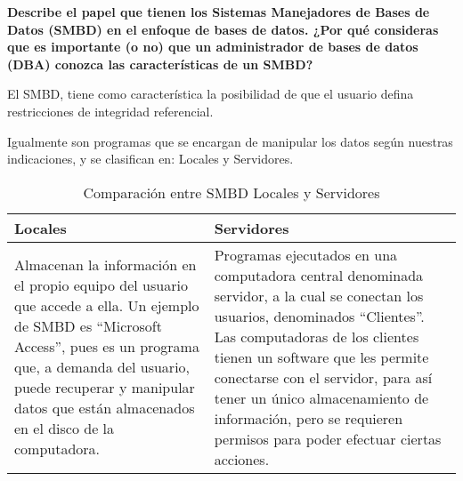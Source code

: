 \begin{center} 
\textbf{Describe el papel que tienen los Sistemas Manejadores de Bases de Datos (SMBD) en el enfoque
de bases de datos. ¿Por qué consideras que es importante (o no) que un administrador de bases
de datos (DBA) conozca las características de un SMBD?}
\\
\end{center}



El SMBD, tiene como característica la posibilidad de que el usuario defina restricciones de integridad referencial.

Igualmente son programas que se encargan de manipular los datos según nuestras indicaciones, y se clasifican en: Locales y Servidores. \\

\begin{table}[h!]
\centering
\begin{tabularx}{\textwidth}{|X|X|}
\hline
\textbf{Locales} & \textbf{Servidores} \\
\hline
Almacenan la información en el propio equipo del usuario que accede a ella. Un ejemplo de SMBD es “Microsoft Access”, pues es un programa que, a demanda del usuario, puede recuperar y manipular datos que están almacenados en el disco de la computadora. & Programas ejecutados en una computadora central denominada servidor, a la cual se conectan los usuarios, denominados “Clientes”. Las computadoras de los clientes tienen un software que les permite conectarse con el servidor, para así tener un único almacenamiento de información, pero se requieren permisos para poder efectuar ciertas acciones. \\
\hline
\end{tabularx}
\caption{Comparación entre SMBD Locales y Servidores}
\label{tab:locales_vs_servidores}
\end{table}



